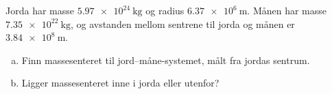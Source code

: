 %
Jorda har masse $\SI{5.97e24}{\kilo\gram}$ og radius $\SI{6.37e6}{\metre}$. Månen har masse $\SI{7.35e22}{\kilo\gram}$, og avstanden mellom sentrene til jorda og månen er $\SI{3.84e8}{\metre}$.
\begin{enumerate}[a)]
    \item Finn massesenteret til jord--måne-systemet, målt fra jordas sentrum.
    \item Ligger massesenteret inne i jorda eller utenfor?
\end{enumerate}
